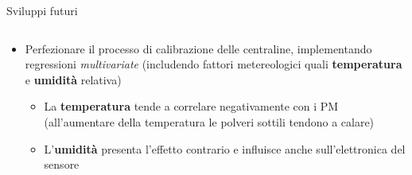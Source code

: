 \begin{frame}{Sviluppi futuri}
\begin{columns}

\begin{column}{0.6\textwidth}
\begin{itemize}
  \item Perfezionare il processo di calibrazione delle centraline, implementando regressioni \textit{multivariate} (includendo fattori metereologici quali \textbf{temperatura} e \textbf{umidità} relativa)\vspace{0.2cm}
  \begin{itemize}
    \item La \textbf{temperatura} tende a correlare negativamente con i PM (all'aumentare della temperatura le polveri sottili tendono a calare)\vspace{0.2cm}
    \item L'\textbf{umidità} presenta l'effetto contrario e influisce anche sull'elettronica del sensore
  \end{itemize}\vspace{0.1cm}
\end{itemize}

\end{column}


\end{columns}
\end{frame}
